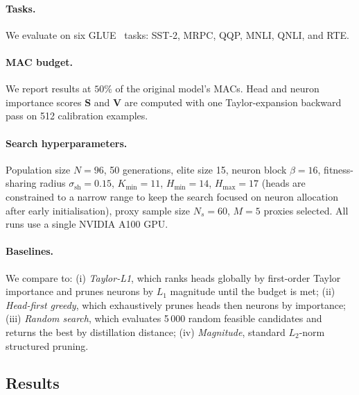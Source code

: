 \documentclass{article}
\newcommand{\Sb}{\mathbf{S}}
\newcommand{\Vb}{\mathbf{V}}
\begin{document}
\paragraph{Tasks.}
We evaluate on six GLUE~\citep{wang2018glue} tasks:
SST-2, MRPC, QQP, MNLI, QNLI, and RTE.

\paragraph{MAC budget.}
We report results at $50\%$ of the original model's MACs.  Head and
neuron importance scores $\Sb$ and $\Vb$ are computed with one
Taylor-expansion backward pass on 512 calibration examples.

\paragraph{Search hyperparameters.}
Population size $N=96$, 50 generations, elite size 15, neuron block
$\beta=16$, fitness-sharing radius $\sigma_{\mathrm{sh}}=0.15$,
$K_{\min}=11$, $H_{\min}=14$, $H_{\max}=17$ (heads are constrained to
a narrow range to keep the search focused on neuron allocation after
early initialisation), proxy sample size $N_s=60$, $M=5$ proxies
selected.  All runs use a single NVIDIA A100 GPU.

\paragraph{Baselines.}
We compare to:
(i) \emph{Taylor-L1}, which ranks heads globally by first-order
Taylor importance and prunes neurons by $L_1$ magnitude until the
budget is met;
(ii) \emph{Head-first greedy}, which exhaustively prunes heads then
neurons by importance;
(iii) \emph{Random search}, which evaluates 5\,000 random feasible
candidates and returns the best by distillation distance;
(iv) \emph{Magnitude}, standard $L_2$-norm structured pruning.

\subsection{Results}
\end{document}
